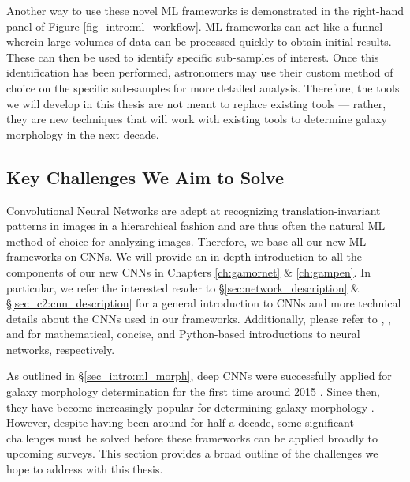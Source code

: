 Another way to use these novel ML frameworks is demonstrated in the right-hand panel of Figure \ref{fig_intro:ml_workflow}. ML frameworks can act like a funnel wherein large volumes of data can be processed quickly to obtain initial results. These can then be used to identify specific sub-samples of interest. Once this identification has been performed, astronomers may use their custom method of choice on the specific sub-samples for more detailed analysis. Therefore, the tools we will develop in this thesis are not meant to replace existing tools --- rather, they are new techniques that will work with existing tools to determine galaxy morphology in the next decade. 


\subsection{Key Challenges We Aim to Solve} \label{sec_intro:challenges}

Convolutional Neural Networks are adept at recognizing translation-invariant patterns in images in a hierarchical fashion and are thus often the natural ML method of choice for analyzing images. Therefore, we base all our new ML frameworks on CNNs. We will provide an in-depth introduction to all the components of our new CNNs in Chapters \ref{ch:gamornet} \& \ref{ch:gampen}. In particular, we refer the interested reader to \S \ref{sec:network_description} \& \S\ref{sec_c2:cnn_description} for a general introduction to CNNs and more technical details about the CNNs used in our frameworks. Additionally, please refer to \citet{mckay_03}, \citet{nielsen}, and \citet{chollet_21} for mathematical, concise, and Python-based introductions to neural networks, respectively.

As outlined in \S \ref{sec_intro:ml_morph}, deep CNNs were successfully applied for galaxy morphology determination for the first time around 2015 \citep{Dieleman2015Rotation-invariantPrediction, Huertas-Company2015ALEARNING}. Since then, they have become increasingly popular for determining galaxy morphology \citep[e.g.,][]{Tuccillo2018DeepFitting, Hausen2020MorpheusData, Walmsley2020GalaxyLearning, Cheng2021GalaxyNetworks, Vega-Ferrero2021PushingSurvey, Tarsitano2022ImageLearning}. However, despite having been around for half a decade, some significant challenges must be solved before these frameworks can be applied broadly to upcoming surveys. This section provides a broad outline of the challenges we hope to address with this thesis. 

